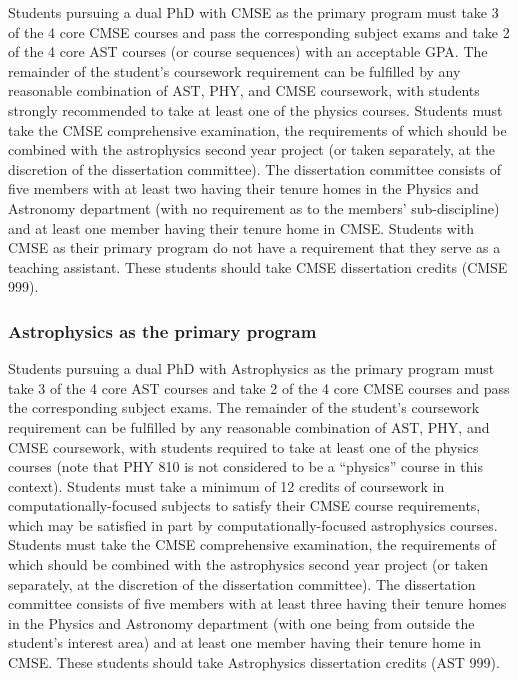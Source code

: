 Students pursuing a dual PhD with CMSE as the primary program must
take 3 of the 4 core CMSE courses and pass the corresponding subject
exams and take 2 of the 4 core AST courses (or course sequences) with
an acceptable GPA.  The remainder of the student's
coursework requirement can be fulfilled by any reasonable combination
of AST, PHY, and CMSE coursework, with students strongly recommended to
take at least one of the physics courses.  Students must take the CMSE
comprehensive examination, the requirements of which should be
combined with the astrophysics second year project (or taken
separately, at the discretion of the dissertation committee).  The
dissertation committee consists of five members with at least two
having their tenure homes in the Physics and Astronomy department
(with no requirement as to the members' sub-discipline) and at least
one member having their tenure home in CMSE.  Students with CMSE as
their primary program do not have a requirement that they serve as a
teaching assistant.  These students should take CMSE dissertation
credits (CMSE 999).

\subsubsection{Astrophysics as the primary program}

Students pursuing a dual PhD with Astrophysics as the primary program
must take 3 of the 4 core AST courses and take 2 of the 4 core CMSE
courses and pass the corresponding subject exams.  The remainder of
the student's coursework requirement can be fulfilled by any
reasonable combination of AST, PHY, and CMSE coursework, with students
required to take at least one of the physics courses (note that PHY 810 is not
considered to be a ``physics'' course in this context).  Students must take a minimum
of 12 credits of coursework in computationally-focused subjects to
satisfy their CMSE course requirements, which may be satisfied in part
by
computationally-focused astrophysics courses.
Students must take the CMSE comprehensive examination, the
requirements of which should be combined with the astrophysics second
year project (or taken separately, at the discretion of the
dissertation committee).  The dissertation committee consists of five
members with at least three having their tenure homes in the Physics
and Astronomy department (with one being from outside the student's
interest area) and at least one member having their tenure home in
CMSE.  These students should take Astrophysics dissertation credits
(AST 999).

